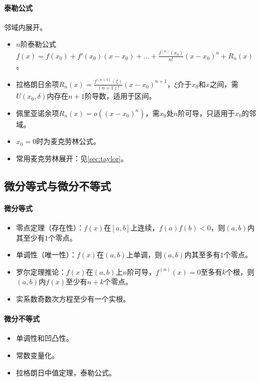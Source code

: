 \documentclass[
12pt, %
a4paper, 
oneside, %
headinclude,footinclude, %
]{scrartcl}
\begin{document}
\paragraph{泰勒公式}
邻域内展开。
\begin{itemize}
\item $ n $阶泰勒公式$ f(x) = f(x_0) + f'(x_0)(x - x_0) + \dots + \frac{f^{(n)}(x_0)}{n!}(x - x_0)^n + R_n(x) $。
\item 拉格朗日余项$ R_n(x) = \frac{f^{(n + 1)}(\xi)}{(n + 1)!}(x - x_0)^{n + 1} $，$ \xi $介于$ x_0 $和$ x $之间，需$ U(x_0, \delta) $内存在$ n + 1 $阶导数，适用于区间。
\item 佩里亚诺余项$ R_n(x) = o((x-x_0)^n) $，需$ x_0 $处$ n $阶可导，只适用于$ x_0 $的邻域。
\item $ x_0 = 0 $时为麦克劳林公式。
\item 常用麦克劳林展开：见\ref{sec:taylor}。
\end{itemize}
\subsection[微分等式与微分不等式]{微分等式与微分不等式}
\paragraph{微分等式}
\begin{itemize}
\item 零点定理（存在性）：$ f(x) $在$ [a, b] $上连续，$ f(a)f(b) < 0 $，则$ (a, b) $内其至少有$ 1 $个零点。
\item 单调性（唯一性）：$ f(x) $在$ (a, b) $上单调，则$ (a, b) $内其至多有$ 1 $个零点。
\item 罗尔定理推论：$ f(x) $在$ (a, b) $上$ n $阶可导，$ f^{(n)}(x) = 0 $至多有$ k $个根，则$ (a, b) $内$ f(x) $至少有$ n + k $个零点。
\item 实系数奇数次方程至少有一个实根。
\end{itemize}
\paragraph{微分不等式}
\begin{itemize}
\item 单调性和凹凸性。
\item 常数变量化。
\item 拉格朗日中值定理，泰勒公式。
\end{itemize}
\end{document}
